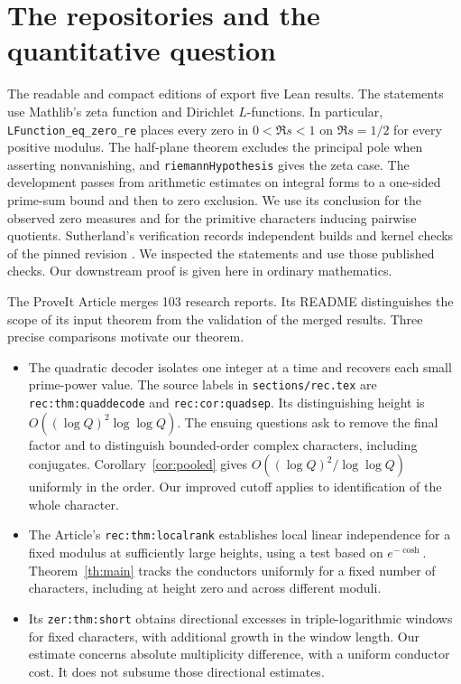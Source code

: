 \documentclass[11pt]{article}
\begin{document}
\section{The repositories and the quantitative question}\label{sec:sources}
The readable and compact editions of \cite{lean} export five Lean results. The statements use Mathlib's zeta function and Dirichlet $L$-functions. In particular, \texttt{LFunction\_eq\_zero\_re} places every zero in $0<\Re s<1$ on $\Re s=1/2$ for every positive modulus. The half-plane theorem excludes the principal pole when asserting nonvanishing, and \texttt{riemannHypothesis} gives the zeta case. The development passes from arithmetic estimates on integral forms to a one-sided prime-sum bound and then to zero exclusion. We use its conclusion for the observed zero measures and for the primitive characters inducing pairwise quotients. Sutherland's verification records independent builds and kernel checks of the pinned revision \cite{checks}. We inspected the statements and use those published checks. Our downstream proof is given here in ordinary mathematics.

The ProveIt Article \cite{article} merges 103 research reports. Its README distinguishes the scope of its input theorem from the validation of the merged results. Three precise comparisons motivate our theorem.
\begin{itemize}
\item The quadratic decoder isolates one integer at a time and recovers each small prime-power value. The source labels in \texttt{sections/rec.tex} are \texttt{rec:thm:quaddecode} and \texttt{rec:cor:quadsep}. Its distinguishing height is $O((\log Q)^2\log\log Q)$. The ensuing questions ask to remove the final factor and to distinguish bounded-order complex characters, including conjugates. Corollary~\ref{cor:pooled} gives $O((\log Q)^2/\log\log Q)$ uniformly in the order. Our improved cutoff applies to identification of the whole character.
\item The Article's \texttt{rec:thm:localrank} establishes local linear independence for a fixed modulus at sufficiently large heights, using a test based on $e^{-\cosh}$. Theorem~\ref{th:main} tracks the conductors uniformly for a fixed number of characters, including at height zero and across different moduli.
\item Its \texttt{zer:thm:short} obtains directional excesses in triple-logarithmic windows for fixed characters, with additional growth in the window length. Our estimate concerns absolute multiplicity difference, with a uniform conductor cost. It does not subsume those directional estimates.
\end{itemize}
\end{document}
